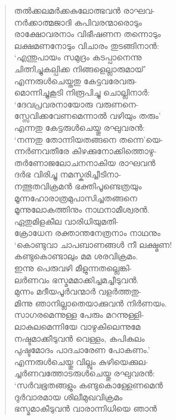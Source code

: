 \begin{verse}
തല്‍ക്കലമര്‍ക്കകുലോത്ഭവന്‍ രാഘവ-\\
നര്‍ക്കാത്മജാദി കപിവരന്മാരൊടും\\
രാക്ഷോവരനാം വിഭീഷണന‍ തന്നൊടും\\
ലക്ഷമണനോടും വിചാരം തുടങ്ങിനാന്‍:\\
‘എന്തുപായം സമുദ്രം കടപ്പാനെന്നു\\
ചിത്നിച്ചുകല്പിക്ക നിങ്ങളെല്ലാരുമായ്’\\
എന്നരുള്‍ചെയ്തതു കേട്ടവരേവരു-\\
മൊന്നിച്ചുകൂടി നിരൂപിച്ചു ചൊല്ലിനാര്‍:\\
‘ദേവപ്രവരനായോരു വരുണനെ-\\
സ്സേവിക്കവേണമെന്നാല്‍ വഴിയും തരും’\\
എന്നതു കേട്ടരുള്‍ചെയ്തു രഘുവരന്‍:\\
‘നന്നതു തോന്നിയതങ്ങനെ തന്നെ’യെ-\\
ന്നര്‍ണവതീരേ കിഴക്കുനോക്കിത്തൊഴു-\\
തര്‍ണോജലോചനനാകിയ രാഘവന്‍\\
ദര്‍ഭ വിരിച്ചു നമസ്കരിച്ചീടിനാ-\\
നത്ഭുതവിക്രമന്‍ ഭക്തിപൂണ്ടെത്രയും\\
മൂന്നഹോരാത്രമുപാസിച്ചതങ്ങനെ\\
മൂന്നുലോകത്തിനും നാഥനാമീശ്വരന്‍.\\
ഏതുമിളകീല വാരിധിയുമതി-\\
ക്രോധേന രക്താന്തനേത്രനാം നാഥനും\\
‘കൊണ്ടുവാ ചാപബാണങ്ങള്‍ നീ ലക്ഷ്മണ!\\
കണ്ടുകൊണ്ടാലും മമ ശരവിക്രമം.\\
ഇന്നു പെരുവഴി മീളുന്നതല്ലെങ്കി-\\
ലര്‍ണവം ഭസ്മമമാക്കിച്ചമച്ചീടുവന്‍.\\
മുന്നം മദീയപൂര്‍വന്മാര്‍ വളര്‍ത്തതു-\\
മിന്നു ഞാനില്ലാതെയാക്കുവന്‍ നിര്‍ണയം.\\
സാഗരമെന്നുള്ള പേരും മറന്നുള്ളി-\\
ലാകുലമെന്നിയേ വാഴുകിലെന്നുമേ\\
നഷ്ടമാക്കീടുവന്‍ വെള്ളം, കപികുലം\\
പുഷ്ടമോദം പാദചാരേണ പോകണം.’\\
എന്നരുള്‍ചെയ്തു വില്ലും കുഴിയെക്കുല-\\
ച്ചര്‍ണവത്തോടരുള്‍ചെയ്തു രഘുവരന്‍:\\
‘സര്‍വഭൂതങ്ങളും കണ്ടുകൊള്ളേണമെന്‍\\
ദുര്‍വാരമായ ശിലീമുഖവിക്രമം\\
ഭസ്മമാകീടുവന്‍ വാരാന്നിധിയെ ഞാന്‍\\

\end{verse}
